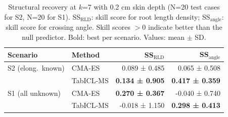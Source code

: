 \begin{table}[htbp]
\centering
\caption{Structural recovery at $k$=7 with 0.2 cm skin depth (N=20 test cases for S2, N=20 for S1). SS$_\mathrm{RLD}$: skill score for root length density; SS$_\mathrm{angle}$: skill score for crossing angle. Skill scores $>0$ indicate better than the null predictor. Bold: best per scenario. Values: mean $\pm$ SD.}
\label{tab:structural_recovery_v2}
\begin{tabular}{llrr}
\toprule
Scenario & Method & SS$_\mathrm{RLD}$ & SS$_\mathrm{angle}$ \\
\midrule
  S2 (elong.\ known) & CMA-ES & 0.089 ± 0.485 & 0.065 ± 0.508 \\
   & TabICL-MS & \textbf{0.134 ± 0.905} & \textbf{0.417 ± 0.359} \\
\midrule
  S1 (all unknown) & CMA-ES & \textbf{0.270 ± 0.367} & -0.040 ± 0.740 \\
   & TabICL-MS & -0.018 ± 1.150 & \textbf{0.298 ± 0.413} \\
\bottomrule
\end{tabular}
\end{table}
